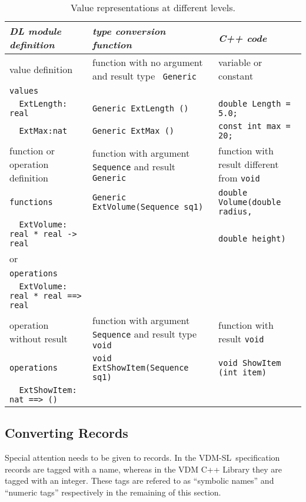 \documentclass[\pformat,12pt]{article}
\newcommand{\vdmslpp}{VDM-SL}
\begin{document}
\begin{table}
\begin{center}
\begin{sideways}
\begin{tabular}{|p{7cm}|p{7cm}|p{6cm}|}
\hline
{\it DL module definition}&{\it type conversion
  function}&{\it C++ code}\\
\hline \hline
value definition&function with no argument and result type {\tt
  Generic}&variable or constant \\ \hline
\verb+values+            & & \\
\verb+  ExtLength: real+ & \verb+Generic ExtLength ()+ & \verb+double Length = 5.0;+ \\
\verb+  ExtMax:nat+      & \verb+Generic ExtMax ()+    & \verb+const int max = 20;+ \\ \hline\hline
function or operation definition & 
function with argument {\tt Sequence} and result {\tt Generic} & 
function with result different from {\tt void} \\ \hline
\verb+functions+ & \verb+Generic ExtVolume(Sequence sq1)+ & \verb+double Volume(double radius,+ \\
\verb+  ExtVolume: real * real -> real+ &                 & \verb+              double height)+ \\
or & & \\
\verb+operations+ & & \\
\verb+  ExtVolume: real * real ==> real+ & & \\ \hline \hline
operation without result 
& function with argument {\tt Sequence} and result type {\tt void}&
function with result {\tt void} \\ \hline
\verb+operations+ & \verb+void ExtShowItem(Sequence sq1)+ & \verb+void ShowItem (int item)+ \\
\verb+  ExtShowItem: nat ==> ()+ & & \\[1ex]
\hline \hline
\end{tabular}
\end{sideways}
\end{center}
\caption{Value representations at different levels.} 
\label{table1}
\end{table}

\subsection{Converting Records}

Special attention needs to be given to records. In the \vdmslpp\ 
specification records are tagged with a name, whereas in the VDM C++
Library they are tagged with an integer. These tags are refered to as
``symbolic names'' and ``numeric tags'' respectively in the remaining
of this section.
\end{document}
